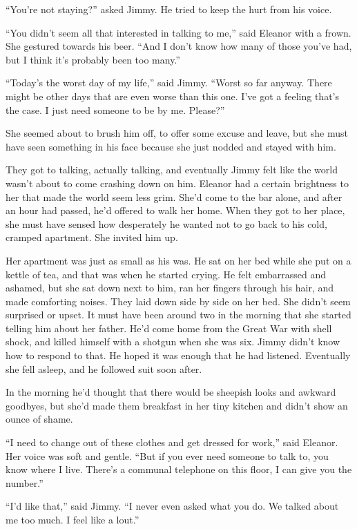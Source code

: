 ``You're not staying?'' asked Jimmy. He tried to keep the hurt from his
voice.

``You didn't seem all that interested in talking to me,'' said Eleanor
with a frown. She gestured towards his beer. ``And I don't know how many
of those you've had, but I think it's probably been too many.''

``Today's the worst day of my life,'' said Jimmy. ``Worst so far anyway.
There might be other days that are even worse than this one. I've got a
feeling that's the case. I just need someone to be by me. Please?''

She seemed about to brush him off, to offer some excuse and leave, but
she must have seen something in his face because she just nodded and
stayed with him.

They got to talking, actually talking, and eventually Jimmy felt like
the world wasn't about to come crashing down on him. Eleanor had a
certain brightness to her that made the world seem less grim. She'd come
to the bar alone, and after an hour had passed, he'd offered to walk her
home. When they got to her place, she must have sensed how desperately
he wanted not to go back to his cold, cramped apartment. She invited him
up.

Her apartment was just as small as his was. He sat on her bed while she
put on a kettle of tea, and that was when he started crying. He felt
embarrassed and ashamed, but she sat down next to him, ran her fingers
through his hair, and made comforting noises. They laid down side by
side on her bed. She didn't seem surprised or upset. It must have been
around two in the morning that she started telling him about her father.
He'd come home from the Great War with shell shock, and killed himself
with a shotgun when she was six. Jimmy didn't know how to respond to
that. He hoped it was enough that he had listened. Eventually she fell
asleep, and he followed suit soon after.

In the morning he'd thought that there would be sheepish looks and
awkward goodbyes, but she'd made them breakfast in her tiny kitchen and
didn't show an ounce of shame.

``I need to change out of these clothes and get dressed for work,'' said
Eleanor. Her voice was soft and gentle. ``But if you ever need someone
to talk to, you know where I live. There's a communal telephone on this
floor, I can give you the number.''

``I'd like that,'' said Jimmy. ``I never even asked what you do. We
talked about me too much. I feel like a lout.''

